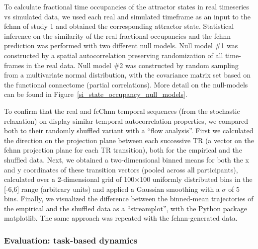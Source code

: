 \documentclass{article}
\begin{document}
To calculate fractional time occupancies of the attractor states in real timeseries vs simulated data, we used each real and simulated timeframe as an input to the \acrshort{fchnn} of study 1 and obtained the corresponding attractor state. Statistical inference on the similarity of the real fractional occupancies and the \acrshort{fchnn} prediction was performed with two different null models. Null model \#1 was constructed by a spatial autocorrelation preserving randomization of all time-frames in the real data. Null model \#2 was constructed  by random sampling from a multivariate normal distribution, with the covariance matrix set based on the functional connectome (partial correlations). More detail on the null-models can be found in Figure~\ref{si_state_occupancy_null_models}.

To confirm that the real and fcC\acrshort{hnn} temporal sequences (from the stochastic relaxation) on display similar temporal autocorrelation properties, we compared both to their randomly shuffled variant with a ``flow analysis''.
First we calculated the direction on the projection plane between each successive TR (a vector on the \acrshort{fchnn} projection plane for each TR transition), both for the empirical and the shuffled data.
Next, we obtained a two-dimensional binned means for both the x and y coordinates of these transition vectors (pooled across all participants), calculated over a 2-dimensional grid of 100$\times$100 uniformly distributed bins in the [-6,6] range (arbitrary units) and applied a Gaussian smoothing with a $\sigma$ of 5 bins.
Finally, we visualized the difference between the binned-mean trajectories of the empirical and the shuffled data as a ``streamplot'', with the Python package matplotlib.
The same approach was repeated with the \acrshort{fchnn}-generated data.

\subsubsection{Evaluation: task-based dynamics}
\end{document}
